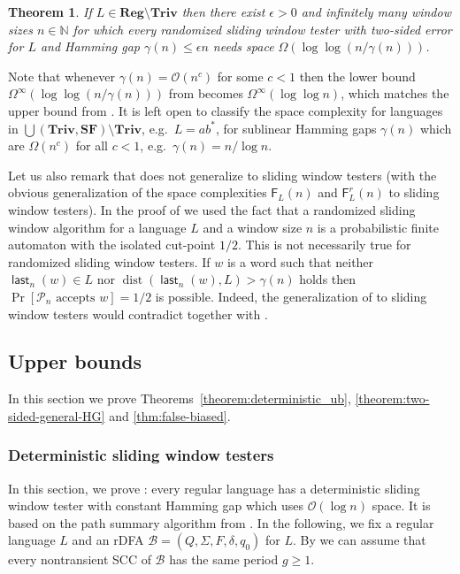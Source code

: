\documentclass{article}\usepackage[a4paper,margin=20mm]{geometry}
\newtheorem{theorem}{Theorem}\newtheorem{lemma}[theorem]{Lemma}\newtheorem{proposition}[theorem]{Proposition}\newtheorem{corollary}[theorem]{Corollary}\newtheorem{definition}[theorem]{Definition}\newtheorem{claim}[theorem]{Claim}\newtheorem{remark}[theorem]{Remark}\newtheorem{observation}[theorem]{Observation}\newtheorem{conjecture}[theorem]{Conjecture}\newtheorem{example}[theorem]{Example}
\newcommand{\N}{\mathbb{N}}
\newcommand{\B}{\mathcal{B}}
\renewcommand{\O}{\mathcal{O}}
\renewcommand{\P}{\mathcal{P}}
\newcommand{\F}{\mathsf{F}}
\DeclareMathOperator{\last}{\mathsf{last}}
\DeclareMathOperator{\dist}{dist}
\newcommand{\Reg}{\mathbf{Reg}}
\newcommand{\Triv}{\mathbf{Triv}}
\newcommand{\SF}{\mathbf{SF}}
\renewcommand{\geq}{\geqslant}
\renewcommand{\leq}{\leqslant}
\renewcommand{\le}{\leq}
\newcommand{\Omegainf}{\Omega^{\scriptscriptstyle{\infty}}}
\begin{document}
\begin{theorem} \label{lemma-loglog(n-gamma)}
If $L \in \Reg \setminus \Triv$ then there exist $\epsilon > 0$ and infinitely many window sizes $n \in \N$ for which
every randomized sliding window tester with two-sided error for $L$ and Hamming gap $\gamma(n) \le \epsilon n$ needs space $\Omega(\log\log(n/\gamma(n)))$.
\end{theorem}
Note that whenever $\gamma(n) = \O(n^c)$ for some $c < 1$ then the lower bound 
$\Omegainf(\log\log(n/\gamma(n)))$ from  becomes 
$\Omegainf(\log \log n)$, which matches the upper bound from .
It is left open to classify the space complexity for languages in $\bigcup(\Triv, \SF) \setminus \Triv$, e.g.\ $L = ab^*$,
for sublinear Hamming gaps $\gamma(n)$ which are $\Omega(n^c)$ for all $c < 1$, e.g.\ $\gamma(n) =  n/\log n$.

Let us also remark that  does not generalize to sliding window testers (with the obvious generalization of the space complexities
$\F_L(n)$ and $\F_L^r(n)$ to sliding window testers). In the proof of  we used the fact that a randomized sliding window algorithm
for a language $L$ and a window size $n$ is a probabilistic finite automaton with the isolated cut-point $1/2$. This is not necessarily true for 
randomized sliding window testers. If $w$ is a word such that neither  $\last_n(w) \in L$ nor $\dist(\last_n(w),L) > \gamma(n)$ holds then 
$\Pr[\P_n \text{ accepts } w] = 1/2$ is possible. Indeed, the generalization of  to sliding window testers would
contradict  together with .


\subsection{Upper bounds}

In this section we prove Theorems~\ref{theorem:deterministic_ub}, \ref{theorem:two-sided-general-HG} and \ref{thm:false-biased}.

\subsubsection{Deterministic sliding window testers}

In this section, we prove : every regular language has a deterministic sliding window tester
with constant Hamming gap which uses $\O(\log n)$ space.
It is based on the path summary algorithm from .
In the following, we fix a regular language $L$ and an rDFA $\B = (Q,\Sigma,F,\delta,q_0)$ for $L$.
By  we can assume that every nontransient SCC
of $\B$ has the same period $g \geq 1$.
\end{document}
